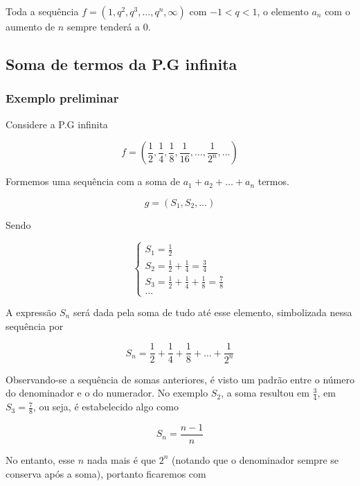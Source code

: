 \documentclass[11pt]{article}
\begin{document}
\begin{tcolorbox}[colback=LightYellow]
Toda a sequência $f = (1, q^{2}, q^{3}, \dots, q^{n}, \infty)$ com $-1 < q < 1$, o elemento $a_{n}$ com o aumento de $n$ sempre tenderá a 0.
\end{tcolorbox}

\subsection{Soma de termos da P.G infinita}

\subsubsection{Exemplo preliminar}

Considere a P.G infinita

\begin{tcolorbox}[colback=LightYellow]
\[f = \left(\frac{1}{2}, \frac{1}{4}, \frac{1}{8}, \frac{1}{16}, \dots, \frac{1}{2^{n}}, \dots \right)\]
\end{tcolorbox}

Formemos uma sequência com a soma de $a_{1} + a_{2} + \dots + a_{n}$ termos.

\[g = (S_{1}, S_{2}, \dots)\]

Sendo

\begin{equation*}
  \begin{cases}
    S_{1} = \frac{1}{2} \\
    S_{2} = \frac{1}{2} + \frac{1}{4} = \frac{3}{4} \\
    S_{3} = \frac{1}{2} + \frac{1}{4} + \frac{1}{8} = \frac{7}{8} \\
    \dots
  \end{cases}
\end{equation*}

A expressão $S_{n}$ será dada pela soma de tudo até esse elemento, simbolizada nessa sequência por

\[S_{n} = \frac{1}{2} + \frac{1}{4} + \frac{1}{8} + \dots + \frac{1}{2^{n}}\]

Observando-se a sequência de somas anteriores, é visto um padrão entre o número do denominador e o do numerador. No exemplo $S_{2}$, a soma resultou em $\frac{3}{4}$, em $S_{3} = \frac{7}{8}$, ou seja, é estabelecido algo como

\[S_{n} = \frac{n - 1}{n}\]

No entanto, esse $n$ nada mais é que $2^{n}$ (notando que o denominador sempre se conserva após a soma), portanto ficaremos com
\end{document}
